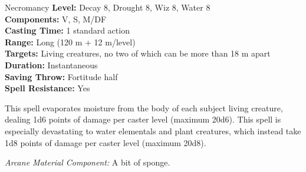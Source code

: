 {Necromancy}
{
	\textbf{Level:}
	Decay 8, Drought 8, Wiz 8, Water 8\\
	\textbf{Components:}
	V, S, M/DF\\
	\textbf{Casting Time:}
	1 standard action\\
	\textbf{Range:}
	Long (120 m + 12 m/level)\\
	\textbf{Targets:}
	Living creatures, no two of which can be more than 18 m apart\\
	\textbf{Duration:}
	Instantaneous\\
	\textbf{Saving Throw:}
	Fortitude half\\
	\textbf{Spell Resistance:}
	Yes\\
}
{
	This spell evaporates moisture from the body of each subject living creature, dealing 1d6 points of damage per caster level (maximum 20d6). This spell is especially devastating to water elementals and plant creatures, which instead take 1d8 points of damage per caster level (maximum 20d8).

	\textit{Arcane Material Component:}
	A bit of sponge.

}
